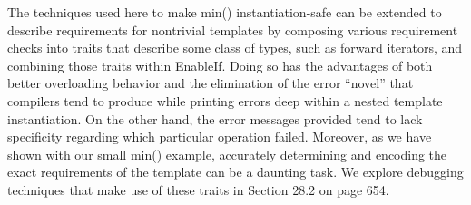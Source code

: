 The techniques used here to make min() instantiation-safe can be extended to describe requirements for nontrivial templates by composing various requirement checks into traits that describe some class of types, such as forward iterators, and combining those traits within EnableIf. Doing so has the advantages of both better overloading behavior and the elimination of the error “novel” that compilers tend to produce while printing errors deep within a nested template instantiation. On the other hand, the error messages provided tend to lack specificity regarding which particular operation failed. Moreover, as we have shown with our small min() example, accurately determining and encoding the exact requirements of the template can be a daunting task. We explore debugging techniques that make use of these traits in Section 28.2 on page 654.





